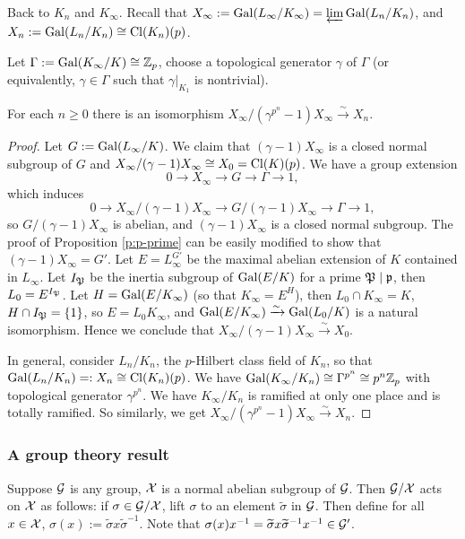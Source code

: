 Back to $K_n$ and $K_\infty$.
Recall that $X_\infty:={\mathrm{Gal}}(L_\infty/K_\infty)=\varprojlim{\mathrm{Gal}}(L_n/K_n)$,
and $X_n:={\mathrm{Gal}}(L_n/K_n)\cong{\mathrm{Cl}}(K_n)(p)$.

Let $\Gamma:={\mathrm{Gal}}(K_\infty/K)\cong{\mathbb {Z}}_p$, choose a topological
generator $\gamma$ of $\Gamma$ (or equivalently, $\gamma\in\Gamma$
such that $\gamma|_{K_1}$ is nontrivial).

\begin{prop}
\label{X-inf-coinv-is-X-n}
For each $n\geq 0$ there is an isomorphism
$X_\infty/(\gamma^{p^n}-1)X_\infty\xrightarrow\sim
X_n$.
\end{prop}

\begin{proof}
Let $G:={\mathrm{Gal}}(L_\infty/K)$.
We claim that $(\gamma-1)X_\infty$ is a closed normal subgroup of $G$
and $X_\infty/(\gamma-1)X_\infty\cong X_0={\mathrm{Cl}}(K)(p)$. We have a group extension
$$
0\to X_\infty\to G\to\Gamma\to 1,
$$
which induces
$$
0\to X_\infty/(\gamma-1)X_\infty\to G/(\gamma-1)X_\infty\to\Gamma\to 1,
$$
so $G/(\gamma-1)X_\infty$ is abelian, and $(\gamma-1)X_\infty$
is a closed normal subgroup.
The proof of Proposition \ref{p:p-prime} can be easily modified to
show that $(\gamma-1)X_\infty=G'$.
Let $E=L_\infty^{G'}$ be the maximal abelian extension
of $K$ contained in $L_\infty$. Let $I_{\mathfrak{P}}$ be the inertia
subgroup of ${\mathrm{Gal}}(E/K)$ for a prime ${\mathfrak{P}}\mid{\mathfrak{p}}$,
then $L_0=E^{I_{\mathfrak{P}}}$. Let $H={\mathrm{Gal}}(E/K_\infty)$
(so that $K_\infty=E^H$), then $L_0\cap K_\infty=K$,
$H\cap I_{\mathfrak{P}}=\{1\}$, so $E=L_0K_\infty$,
and ${\mathrm{Gal}}(E/K_\infty)\xrightarrow\sim{\mathrm{Gal}}(L_0/K)$
is a natural isomorphism.
Hence we conclude that $X_\infty/(\gamma-1)X_\infty\xrightarrow\sim X_0$.

In general, consider $L_n/K_n$, the $p$-Hilbert class field of $K_n$,
so that ${\mathrm{Gal}}(L_n/K_n)=:X_n\cong{\mathrm{Cl}}(K_n)(p)$.
We have ${\mathrm{Gal}}(K_\infty/K_n)\cong\Gamma^{p^n}\cong p^n{\mathbb {Z}}_p$
with topological generator $\gamma^{p^n}$.
We have $K_\infty/K_n$ is ramified at only one place and is
totally ramified. So similarly, we get $X_\infty/(\gamma^{p^n}-1)X_\infty\xrightarrow\sim
X_n$.
\end{proof}

\subsubsection{A group theory result}

Suppose ${\mathcal {G}}$ is any group, ${\mathcal {X}}$ is a normal abelian subgroup of ${\mathcal {G}}$.
Then ${\mathcal {G}}/{\mathcal {X}}$ acts on ${\mathcal {X}}$ as follows:
if $\sigma\in{{\mathcal {G}}/{\mathcal {X}}}$, lift $\sigma$ to an element $\widetilde\sigma$ in ${\mathcal {G}}$.
Then define for all $x\in{\mathcal {X}}$,
$\sigma(x):=\widetilde\sigma x\widetilde\sigma^{-1}$.
Note that $\sigma(x)x^{-1}=\widetilde\sigma x\widetilde{\sigma}^{-1}x^{-1}\in{\mathcal {G}}'$.

